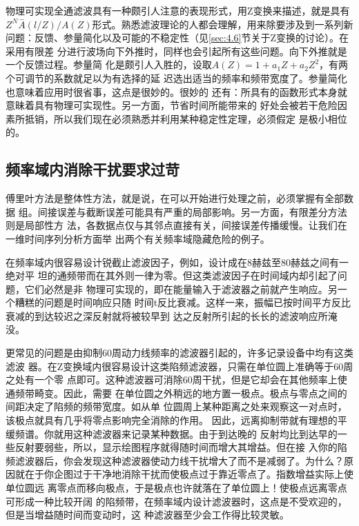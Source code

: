 物理可实现全通滤波具有一种颇引人注意的表现形式，用Z变换来描述，就是具有
$Z^N\overset{-}{A}(l/Z)/A(Z)$形式。熟悉滤波理论的人都会理解，用来除要涉及到一系列新
问题：反馈、参量简化以及可能的不稳定性（见\ref{sec:4.6}节关于Z变换的讨论）。在采用有限差
分进行波场向下外推时，同样也会引起所有这些问题。向下外推就是一个反馈过程。参量简
化是颇引人入胜的，设取$A(Z)=1+a_1Z+a_2Z^2$，有两个可调节的系数就足以为有选择的延
迟选出适当的频率和频带宽度了。参量简化也意味着应用时很省事，这点是很妙的。很妙的
还有：所具有的函数形式本身就意昧着具有物理可实现性。另一方面，节省时间所能带来的
好处会被若干危险因素所抵销，所以我们现在必须熟悉并利用某种稳定性定理，必须假定
是极小相位的。

\subsection{频率域内消除干扰要求过苛}
\label{sec:2.0.3}

傅里叶方法是整体性方法，就是说，在可以开始进行处理之前，必须掌握有全部数据
组。间接误差与截断误差可能具有严重的局部影响。另一方面，有限差分方法则是局部性方
法，各数据点仅与其邻点直接有关，间接误差传播缓慢。让我们在一维时间序列分析方面举
出两个有关频率域隐藏危险的例子。

在频率域内很容易设计锐截止滤波因子，例如，设计成在8赫兹至80赫兹之间有一绝对平
坦的通频带而在其外则一律为零。但这类滤波因子在时间域内却引起了问题，它们必然是非
物理可实现的，即在能量输入于滤波器之前就产生响应。另一个糟糕的问题是时间响应只随
时间t反比衰减。这样一来，振幅已按时间平方反比衰减的到达较迟之深反射就将被较早到
达之反射所引起的长长的滤波响应所淹没。

更常见的问题是由抑制60周动力线频率的滤波器引起的，许多记录设备中均有这类滤波
器。在Z变换域内很容易设计这类陷频滤波器，只需在单位圆上准确等于60周之处有一个零
点即可。这种滤波器可消除60周干扰，但是它却会在其他频率上使通频带畸变。因此，需要
在单位圆之外稍远的地方置一极点。极点与零点之间的间距决定了陷频的频带宽度。如从单
位圆周上某种距离之处来观察这一对点时，该极点就具有几乎将零点影响完全消除的作用。
因此，远离抑制带就有理想的平缓频谱。你就用这种滤波器来记录某种数据。由于到达晚的
反射均比到达早的一些反射要弱些，所以，显示绘图程序就得随时间而增大其增益。但在接
入你的陷频滤波器后，你会发现这种滤波器使动力线干扰增大了而不是减弱了。为什么？原
因就在于你企图过于干净地消除干扰而使极点过于靠近零点了。指数增益实际上使单位圆远
离零点而移向极点，于是极点也许就落在了单位圆上！使极点远离零点可形成一种比较开阔
的陷频带，在频率域内设计滤波器时，这点是不受欢迎的，但是当增益随时间而变动时，这
种滤波器至少会工作得比较灵敏。

